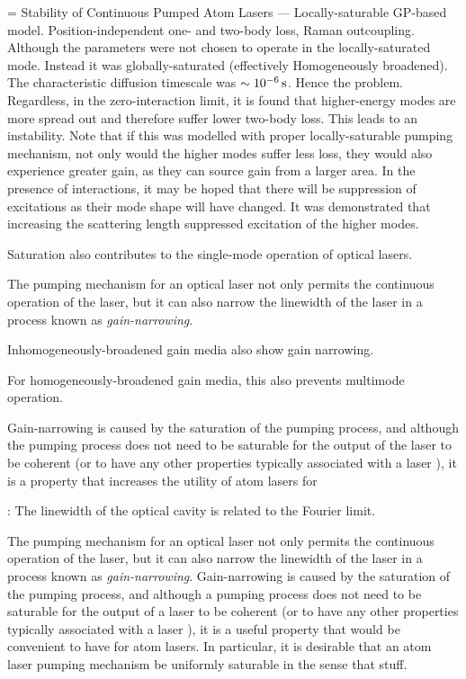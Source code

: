 = Stability of Continuous Pumped Atom Lasers \citep{Haine:2002kp} --- Locally-saturable GP-based model.  Position-independent one- and two-body loss, Raman outcoupling.  Although the parameters were not chosen to operate in the locally-saturated mode.  Instead it was globally-saturated (effectively Homogeneously broadened).  The characteristic diffusion timescale was $\sim \unit[10^{-6}]{s}$.  Hence the problem.  Regardless, in the zero-interaction limit, it is found that higher-energy modes are more spread out and therefore suffer lower two-body loss.  This leads to an instability.  Note that if this was modelled with proper locally-saturable pumping mechanism, not only would the higher modes suffer less loss, they would also experience greater gain, as they can source gain from a larger area.  In the presence of interactions, it may be hoped that there will be suppression of excitations as their mode shape will have changed.  It was demonstrated that increasing the scattering length suppressed excitation of the higher modes.


Saturation also contributes to the single-mode operation of optical lasers.  


The pumping mechanism for an optical laser not only permits the continuous operation of the laser, but it can also narrow the linewidth of the laser in a process known as \emph{gain-narrowing}.  

Inhomogeneously-broadened gain media also show gain narrowing.

For homogeneously-broadened gain media, this also prevents multimode operation.

Gain-narrowing is caused by the saturation of the pumping process, and although the pumping process does not need to be saturable for the output of the laser to be coherent (or to have any other properties typically associated with a laser \citep{Wiseman:1997ba}), it is a property that increases the utility of atom lasers for 

: The linewidth of the optical cavity is related to the Fourier limit.


The pumping mechanism for an optical laser not only permits the continuous operation of the laser, but it can also narrow the linewidth of the laser in a process known as \emph{gain-narrowing}.  Gain-narrowing is caused by the saturation of the pumping process, and although a pumping process does not need to be saturable for the output of a laser to be coherent (or to have any other properties typically associated with a laser \citep{Wiseman:1997ba}), it is a useful property that would be convenient to have for atom lasers.  In particular, it is desirable that an atom laser pumping mechanism be uniformly saturable in the sense that stuff.



